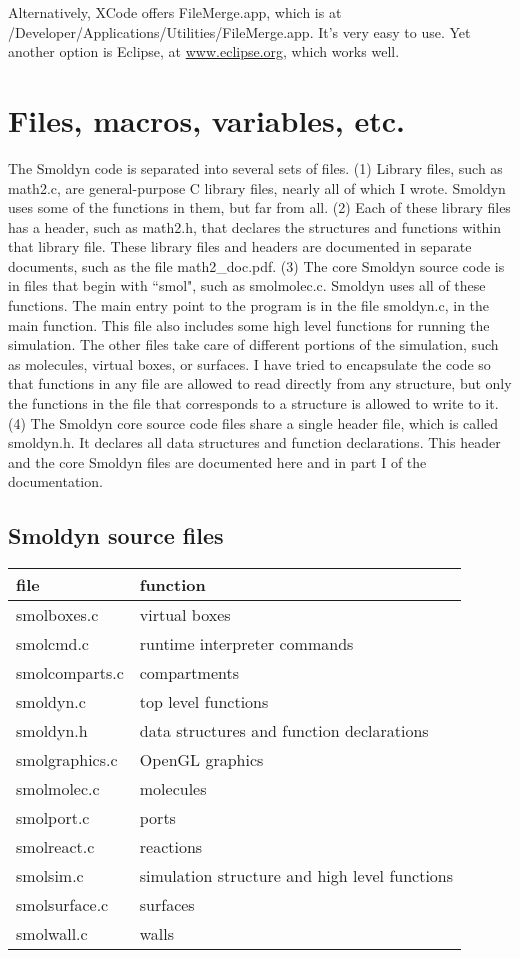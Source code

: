 \documentclass {book}
\begin{document}
Alternatively, XCode offers FileMerge.app, which is at /Developer/Applications/Utilities/FileMerge.app. It's very easy to use. Yet another option is Eclipse, at \url{www.eclipse.org}, which works well.



\chapter{Files, macros, variables, etc.}

The Smoldyn code is separated into several sets of files. (1) Library files, such as math2.c, are general-purpose C library files, nearly all of which I wrote. Smoldyn uses some of the functions in them, but far from all. (2) Each of these library files has a header, such as math2.h, that declares the structures and functions within that library file. These library files and headers are documented in separate documents, such as the file math2\_doc.pdf. (3) The core Smoldyn source code is in files that begin with ``smol", such as smolmolec.c. Smoldyn uses all of these functions. The main entry point to the program is in the file smoldyn.c, in the main function. This file also includes some high level functions for running the simulation. The other files take care of different portions of the simulation, such as molecules, virtual boxes, or surfaces. I have tried to encapsulate the code so that functions in any file are allowed to read directly from any structure, but only the functions in the file that corresponds to a structure is allowed to write to it. (4) The Smoldyn core source code files share a single header file, which is called smoldyn.h. It declares all data structures and function declarations. This header and the core Smoldyn files are documented here and in part I of the documentation.

\section{Smoldyn source files}

\begin{longtable}[c]{ll}
file & function\\
\hline
smolboxes.c & virtual boxes\\
smolcmd.c & runtime interpreter commands\\
smolcomparts.c & compartments\\
smoldyn.c & top level functions\\
smoldyn.h & data structures and function declarations\\
smolgraphics.c & OpenGL graphics\\
smolmolec.c & molecules\\
smolport.c & ports\\
smolreact.c & reactions\\
smolsim.c & simulation structure and high level functions\\
smolsurface.c & surfaces\\
smolwall.c & walls\\
\end{longtable}
\end{document}
